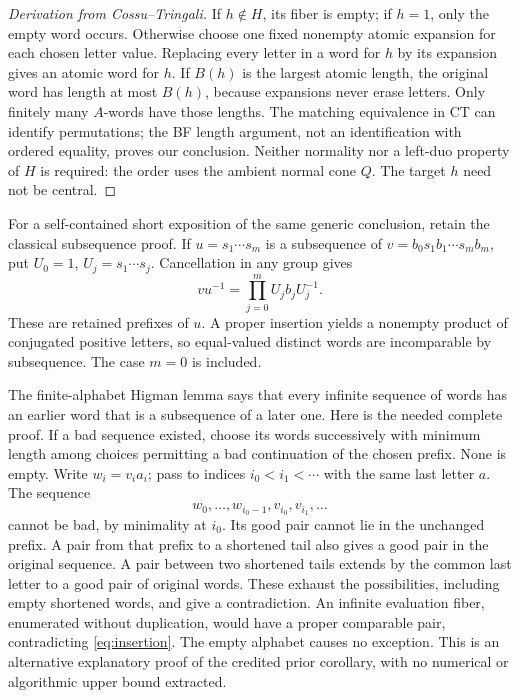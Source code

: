 \documentclass[11pt]{article}
\begin{document}
\begin{proof}[Derivation from Cossu--Tringali]
If $h\notin H$, its fiber is empty; if $h=1$, only the empty word occurs. Otherwise choose one fixed nonempty atomic expansion for each chosen letter value. Replacing every letter in a word for $h$ by its expansion gives an atomic word for $h$. If $B(h)$ is the largest atomic length, the original word has length at most $B(h)$, because expansions never erase letters. Only finitely many $A$-words have those lengths. The matching equivalence in CT can identify permutations; the BF length argument, not an identification with ordered equality, proves our conclusion. Neither normality nor a left-duo property of $H$ is required: the order uses the ambient normal cone $Q$. The target $h$ need not be central.
\end{proof}

For a self-contained short exposition of the same generic conclusion, retain the classical subsequence proof. If $u=s_1\cdots s_m$ is a subsequence of
$v=b_0s_1b_1\cdots s_mb_m$, put $U_0=1$, $U_j=s_1\cdots s_j$. Cancellation in any group gives
\begin{equation}\label{eq:insertion}
vu^{-1}=\prod_{j=0}^m U_jb_jU_j^{-1}.
\end{equation}
These are retained prefixes of $u$. A proper insertion yields a nonempty product of conjugated positive letters, so equal-valued distinct words are incomparable by subsequence. The case $m=0$ is included.

The finite-alphabet Higman lemma \cite{H,CT} says that every infinite sequence of words has an earlier word that is a subsequence of a later one. Here is the needed complete proof. If a bad sequence existed, choose its words successively with minimum length among choices permitting a bad continuation of the chosen prefix. None is empty. Write $w_i=v_i a_i$; pass to indices $i_0<i_1<\cdots$ with the same last letter $a$. The sequence
\[
w_0,\ldots,w_{i_0-1},v_{i_0},v_{i_1},\ldots
\]
cannot be bad, by minimality at $i_0$. Its good pair cannot lie in the unchanged prefix. A pair from that prefix to a shortened tail also gives a good pair in the original sequence. A pair between two shortened tails extends by the common last letter to a good pair of original words. These exhaust the possibilities, including empty shortened words, and give a contradiction. An infinite evaluation fiber, enumerated without duplication, would have a proper comparable pair, contradicting \eqref{eq:insertion}. The empty alphabet causes no exception. This is an alternative explanatory proof of the credited prior corollary, with no numerical or algorithmic upper bound extracted.
\end{document}
